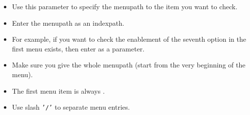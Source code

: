 \begin{itemize}
\item Use this parameter to specify the menupath to the item you want to check.
\item Enter the menupath as an indexpath.
\item For example, if you want to check the enablement of the seventh option in the first menu exists, then enter  as a parameter.
\item Make sure you give the whole menupath (start from the very beginning of the menu).
\item The first menu item is always . 
\item Use slash {\tt '/'} to separate menu entries.
\end{itemize}
